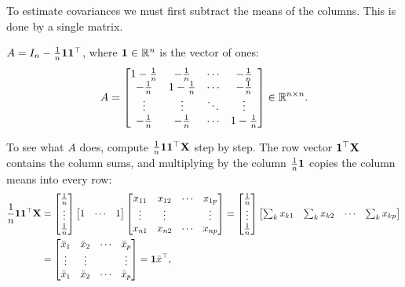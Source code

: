 \begin{notechapter}
To estimate covariances we must first subtract the means of the columns. This
is done by a single matrix.

\begin{definition}
$A = I_n - \frac1n\mathbf{1}\mathbf{1}^\top$, where $\mathbf{1}\in\mathbb{R}^n$ is the vector of
ones:
\[
  A = \begin{bmatrix}
    1 - \frac1n & -\frac1n & \cdots & -\frac1n\\
    -\frac1n & 1 - \frac1n & \cdots & -\frac1n\\
    \vdots & \vdots & \ddots & \vdots\\
    -\frac1n & -\frac1n & \cdots & 1 - \frac1n
  \end{bmatrix}\in\mathbb{R}^{n\times n}.
\]
\end{definition}

To see what $A$ does, compute $\frac1n\mathbf{1}\mathbf{1}^\top\mathbf X$ step by step.
The row vector $\mathbf{1}^\top\mathbf X$ contains the column sums, and multiplying by
the column $\frac1n\mathbf{1}$ copies the column means into every row:
\begin{align*}
  \frac1n\bbone\bbone^\top\mathbf X
  &= \begin{bmatrix}\frac1n\\ \vdots\\ \frac1n\end{bmatrix}
     \begin{bmatrix} 1 & \cdots & 1\end{bmatrix}
     \begin{bmatrix}
       x_{11} & x_{12} & \cdots & x_{1p}\\
       \vdots & \vdots & & \vdots\\
       x_{n1} & x_{n2} & \cdots & x_{np}
     \end{bmatrix}
   = \begin{bmatrix}\frac1n\\ \vdots\\ \frac1n\end{bmatrix}
     \begin{bmatrix} \sum_kx_{k1} & \sum_kx_{k2} & \cdots & \sum_kx_{kp}\end{bmatrix}\\
  &= \begin{bmatrix}
       \bar x_1 & \bar x_2 & \cdots & \bar x_p\\
       \vdots & \vdots & & \vdots\\
       \bar x_1 & \bar x_2 & \cdots & \bar x_p
     \end{bmatrix} = \bbone\bar x^\top,

\end{align*}
\end{notechapter}
